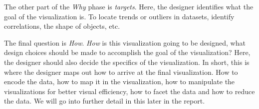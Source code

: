 \documentclass[Report.tex]{subfiles}
\begin{document}
The other part of the \emph{Why} phase is \emph{targets}. Here, the designer identifies what the goal of the visualization is. To locate trends or outliers in datasets, identify correlations, the shape of objects, etc. 

The final question is \emph{How}. \emph{How} is this visualization going to be designed, what design choices should be made to accomplish the goal of the visualization? Here, the designer should also decide the specifics of the visualization. In short, this is where the designer maps out how to arrive at the final visualization. How to encode the data, how to map it in the visualization, how to manipulate the visualizations for better visual efficiency, how to facet the data and how to reduce the data. We will go into further detail in this later in the report.
\end{document}
